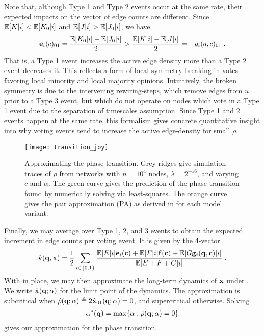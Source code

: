 \documentclass[review, onefignum, onetabnum]{siamart171218}
\begin{document}
        Note that, although Type 1 and Type 2 events occur at the same rate, their expected impacts on the vector of edge counts are different. 
        Since $\mathbb{E}[K|i] < \mathbb{E}[K_0|i]$ and $\mathbb{E}[J|i] > \mathbb{E}[J_0|i]$, we have   
        \begin{align}
            \mathbf{e}_i(c)_{01} = \frac{\mathbb{E}[K_0|i] - \mathbb{E}[J_0|i]}{2} > \frac{\mathbb{E}[K|i] - \mathbb{E}[J|i]}{2} =   
            -{g}_i(q,c)_{01}\;.
        \end{align}
        That is, a Type 1 event increases the active edge density more than a Type 2 event decreases it. 
        This reflects a form of local symmetry-breaking in votes favoring local minority and local majority opinions. 
        Intuitively, the broken symmetry is due to the intervening rewiring-steps, which remove edges from $u$ prior to a Type 3 event, but which do not operate on nodes which vote in a Type 1 event due to the separation of timescales assumption. 
        Since Type 1 and 2 events happen at the same rate, this formalism gives concrete quantitative insight into why voting events tend to increase the active edge-density for small $\rho$. 
        
        
        
        

		\begin{figure}
			\centering
				\texttt{[image: transition\_joy]}
			\caption{Approximating the phase transition. 
			Grey ridges give simulation traces of $\rho$ from networks with $n = 10^4$ nodes, $\lambda = 2^{-16}$, and varying $c$ and $\alpha$. 
			The green curve gives the prediction of the phase transition found by numerically solving  via least-squares. 
			The orange curve gives the pair approximation (PA) as derived in \cite{Durrett2012} for each model variant.}
			\label{fig:transition_joy}
		\end{figure}
        
        Finally, we may average over Type 1, 2, and 3 events to obtain the expected increment in edge counts per voting event. 
        It is given by the 4-vector 
		\begin{align}
			\hat{\mathbf{v}}(\q, \x) = \frac{1}{2} \sum_{i \in \{0,1\}} \frac{\E[E|i]\mathbf{e}_i(\C) + \E[F|i]\mathbf{f}(\C) + \E[G\mathbf{g}_i(\mathbf{q},\mathbf{c})|i]}{\E[E + F + G|i]}\;. \label{eq:v_hat}
		\end{align}
		With  in place, we may then approximate the long-term dynamics of $\mathbf{x}$ under . 
		We write $\hat{\mathbf{x}}(\mathbf{q}; \alpha)$ for the limit point of the dynamics. 
		The approximation is subcritical when $\hat{\rho}(\mathbf{q}; \alpha) \triangleq 2\hat{\mathbf{x}}_{01}(\mathbf{q}; \alpha) = 0$, and supercritical otherwise. 
		Solving 
		\begin{align}
			\alpha^*(\q) = \max \{\alpha : \hat{\rho}(\q; \alpha) = 0\} \label{eq:transition_approx}
		\end{align}
		gives our approximation for the phase transition. 
\end{document}
